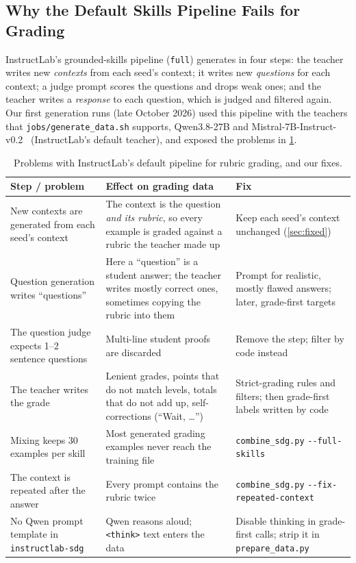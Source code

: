 \documentclass[11pt,a4paper]{article}
\newif\ifdraft
\newcommand{\todo}[2]{%
  \ifdraft\textcolor{red}{\textbf{[TODO #1:} #2\textbf{]}}\fi}
\newcommand{\file}[1]{\nolinkurl{#1}}
\theoremstyle{definition}
\begin{document}
\subsection{Why the Default Skills Pipeline Fails for Grading}\label{sec:default}
InstructLab's grounded-skills pipeline (\texttt{full}) generates in four steps: the teacher writes new \emph{contexts} from each seed's context; it writes new \emph{questions} for each context; a judge prompt scores the questions and drops weak ones; and the teacher writes a \emph{response} to each question, which is judged and filtered again. Our first generation runs (late October 2026) used this pipeline with the teachers that \file{jobs/generate_data.sh} supports, Qwen3.8-27B and Mistral-7B-Instruct-v0.2~\cite{jiang2023mistral} (InstructLab's default teacher), and exposed the problems in \cref{tab:default}.
\todo{}{Confirm which teacher(s) the early runs used; \file{tools/combine_sdg.py} also mentions a \texttt{qwen3-30b-instruct-2507} output folder.}

\begin{table}[t]
\centering
\caption{Problems with InstructLab's default pipeline for rubric grading, and our fixes.}
\label{tab:default}
\small
\begin{tabularx}{\linewidth}{>{\raggedright\arraybackslash}p{4.3cm}>{\raggedright\arraybackslash}X>{\raggedright\arraybackslash}p{4.2cm}}
\toprule
Step / problem & Effect on grading data & Fix\\
\midrule
New contexts are generated from each seed's context & The context is the question \emph{and its rubric}, so every example is graded against a rubric the teacher made up & Keep each seed's context unchanged (\cref{sec:fixed})\\
Question generation writes ``questions'' & Here a ``question'' is a student answer; the teacher writes mostly correct ones, sometimes copying the rubric into them & Prompt for realistic, mostly flawed answers; later, grade-first targets\\
The question judge expects 1--2 sentence questions & Multi-line student proofs are discarded & Remove the step; filter by code instead\\
The teacher writes the grade & Lenient grades, points that do not match levels, totals that do not add up, self-corrections (``Wait, \ldots'') & Strict-grading rules and filters; then grade-first labels written by code\\
Mixing keeps 30 examples per skill & Most generated grading examples never reach the training file & \file{combine_sdg.py} \texttt{-{}-full-skills}\\
The context is repeated after the answer & Every prompt contains the rubric twice & \file{combine_sdg.py} \texttt{-{}-fix-repeated-context}\\
No Qwen prompt template in \texttt{instructlab-sdg} & Qwen reasons aloud; \texttt{<think>} text enters the data & Disable thinking in grade-first calls; strip it in \file{prepare_data.py}\\
\bottomrule
\end{tabularx}
\end{table}
\end{document}

